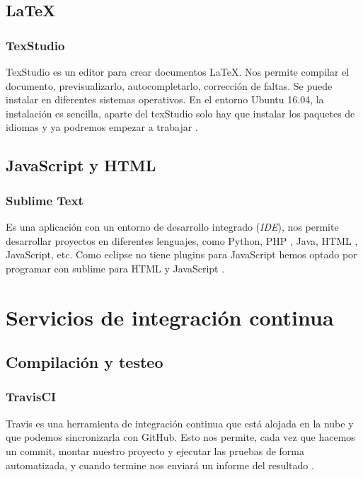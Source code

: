 \subsection{LaTeX}\label{latex}

\subsubsection{TexStudio}\label{texstudio}

TexStudio es un editor para crear documentos \LaTeX. Nos permite compilar el documento, previsualizarlo, autocompletarlo, corrección de faltas. Se puede instalar en diferentes sistemas operativos. En el entorno Ubuntu 16.04, la instalación es sencilla, aparte del texStudio solo hay que instalar los paquetes de idiomas y ya podremos empezar a trabajar \cite{web:texstudio}.

\subsection{JavaScript y HTML}\label{javascript-y-html}

\subsubsection{Sublime Text}\label{sublime-text}

Es una aplicación con un entorno de desarrollo integrado (\emph{IDE}), nos permite desarrollar proyectos en diferentes lenguajes, como Python, PHP , Java, HTML , JavaScript, etc. Como eclipse no tiene plugins para JavaScript hemos optado por programar con sublime para HTML y JavaScript \cite{web:sublime}.

\section{Servicios de integración
	continua}\label{servicios-de-integraciuxf3n-continua}

\subsection{Compilación y testeo}\label{compilacion-y-testeo}

\subsubsection{TravisCI}\label{travis-ci}

Travis es una herramienta de integración continua que está alojada en la nube y que podemos sincronizarla con GitHub. Esto nos permite, cada vez que hacemos un commit, montar nuestro proyecto y ejecutar las pruebas de forma automatizada, y cuando termine nos enviará un informe del resultado \cite{web:travis}.


